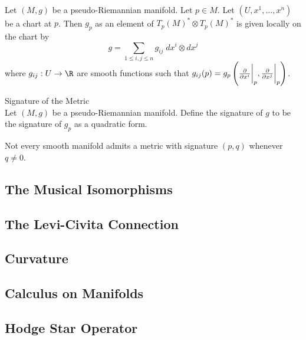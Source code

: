 \documentclass[a4paper]{article}
\begin{document}
\begin{prp}{}{}\\
Let $(M,g)$ be a pseudo-Riemannian manifold. Let $p\in M$. Let $(U,x^1,\dots,x^n)$ be a chart at $p$. Then $g_p$ as an element of $T_p(M)^\ast\otimes T_p(M)^\ast$ is given locally on the chart by $$g=\sum_{1\leq i,j\leq n}g_{ij}\;dx^i\otimes dx^j$$ where $g_{ij}:U\to\R$ are smooth functions such that $g_{ij}(p)=g_p\left(\frac{\partial}{\partial x^i}\bigg{|}_p,\frac{\partial}{\partial x^j}\bigg{|}_p\right)$. 
\end{prp}

\begin{defn}{Signature of the Metric}{}\\
Let $(M,g)$ be a pseudo-Riemannian manifold. Define the signature of $g$ to be the signature of $g_p$ as a quadratic form. 
\end{defn}

Not every smooth manifold admits a metric with signature $(p,q)$ whenever $q\neq 0$. 

\subsection{The Musical Isomorphisms}

\subsection{The Levi-Civita Connection}

\subsection{Curvature}

\subsection{Calculus on Manifolds}

\subsection{Hodge Star Operator}
\end{document}
